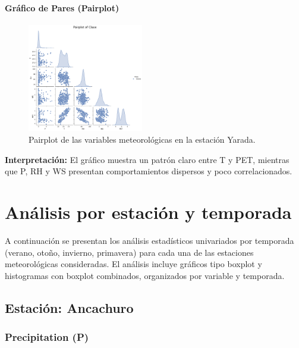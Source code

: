 \subsubsection*{Gráfico de Pares (Pairplot)}
\begin{figure}[H]
\centering
\includegraphics[width=0.45\textwidth]{resultados/por_estacion_meteorologica/Yarada/pairplot.png}
\caption{Pairplot de las variables meteorológicas en la estación Yarada.}
\label{fig:yarada_pairplot}
\end{figure}
\textbf{Interpretación:} El gráfico muestra un patrón claro entre T y PET, mientras que P, RH y WS presentan comportamientos dispersos y poco correlacionados.






\chapter{Análisis por estación y temporada}

A continuación se presentan los análisis estadísticos univariados por temporada (verano, otoño, invierno, primavera) para cada una de las estaciones meteorológicas consideradas. El análisis incluye gráficos tipo boxplot y histogramas con boxplot combinados, organizados por variable y temporada.

\section{Estación: Ancachuro}

\subsection{Precipitation (P)}

